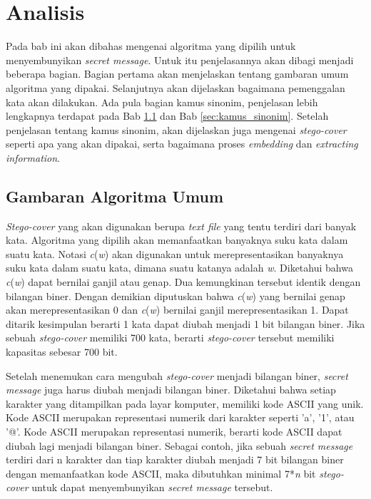 \chapter{Analisis}
Pada bab ini akan dibahas mengenai algoritma yang dipilih untuk menyembunyikan \textit{secret message}. Untuk itu penjelasannya akan dibagi menjadi beberapa bagian. Bagian pertama akan menjelaskan tentang gambaran umum algoritma yang dipakai. Selanjutnya akan dijelaskan bagaimana pemenggalan kata akan dilakukan. Ada pula bagian kamus sinonim, penjelasan lebih lengkapnya terdapat pada Bab \ref{sec:gambaran_umum} dan Bab \ref{sec:kamus_sinonim}. Setelah penjelasan tentang kamus sinonim, akan dijelaskan juga mengenai \textit{stego-cover} seperti apa yang akan dipakai, serta bagaimana proses \textit{embedding} dan \textit{extracting information}.

\section{Gambaran Algoritma Umum}
\label{sec:gambaran_umum}
\textit{Stego-cover} yang akan digunakan berupa \textit{text file} yang tentu terdiri dari banyak kata. Algoritma yang dipilih akan memanfaatkan banyaknya suku kata dalam suatu kata. Notasi \textit{c}(\textit{w}) akan digunakan untuk merepresentasikan banyaknya suku kata dalam suatu kata, dimana suatu katanya adalah \textit{w}. Diketahui bahwa \textit{c}(\textit{w}) dapat bernilai ganjil atau genap. Dua kemungkinan tersebut identik dengan bilangan biner. Dengan demikian diputuskan bahwa \textit{c}(\textit{w}) yang bernilai genap akan merepresentasikan 0 dan \textit{c}(\textit{w}) bernilai ganjil merepresentasikan 1. Dapat ditarik kesimpulan berarti 1 kata dapat diubah menjadi 1 bit bilangan biner. Jika sebuah \textit{stego-cover} memiliki 700 kata, berarti \textit{stego-cover} tersebut memiliki kapasitas sebesar 700 bit.

Setelah menemukan cara mengubah \textit{stego-cover} menjadi bilangan biner, \textit{secret message} juga harus diubah menjadi bilangan biner. Diketahui bahwa setiap karakter yang ditampilkan pada layar komputer, memiliki kode ASCII yang unik. Kode ASCII merupakan representasi numerik dari karakter seperti 'a', '1', atau '@'. Kode ASCII merupakan representasi numerik, berarti kode ASCII dapat diubah lagi menjadi bilangan biner. Sebagai contoh, jika sebuah \textit{secret message} terdiri dari n karakter dan tiap karakter diubah menjadi 7 bit bilangan biner dengan memanfaatkan kode ASCII, maka dibutuhkan minimal 7*\textit{n} bit \textit{stego-cover} untuk dapat menyembunyikan \textit{secret message} tersebut. 

